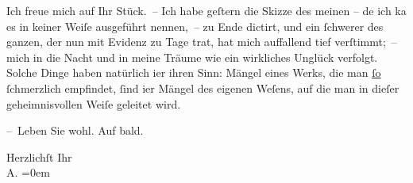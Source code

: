 \pstart
           Ich freue mich auf Ihr Stück. – Ich habe geſtern die Skizze des meinen – de{\geminationn} ich ka{\geminationn} es in keiner Weiſe ausgeführt nennen, – zu Ende
               dictirt, und ein{ }ſchwerer \label{K_L01252-1v}\label{K_L01252-1} des ganzen, der nun mit Evidenz zu Tage trat, hat mich auffallend tief
               verſtimmt; – mich in die Nacht und in meine Träume wie ein wirkliches Unglück ver{\pb}folgt. Solche Dinge haben natürlich i{\geminationm}er ihren Sinn: Mängel eines Werks, die man \uline{ſo}{ }ſchmerzlich empfindet,{ }ſind i{\geminationm}er Mängel des eigenen Weſens, auf die man in dieſer
               geheimnisvollen Weiſe geleitet wird.\pend
           
\pstart
           – Leben Sie wohl. Auf bald.\pend
           
\pstart
           Herzlichſt Ihr{\\[\baselineskip]}\spacefill\mbox{A.}\pend
           \leftskip=0em{}\endnumbering{}  \newcommand{\dateiname}{L01252}\newcommand{\titel}{Arthur Schnitzler an Hugo von Hofmannsthal, [25.? 11. 1902]}\newcommand{\editorInnen}{Martin Anton Müller und Gerd-Hermann Susen}
